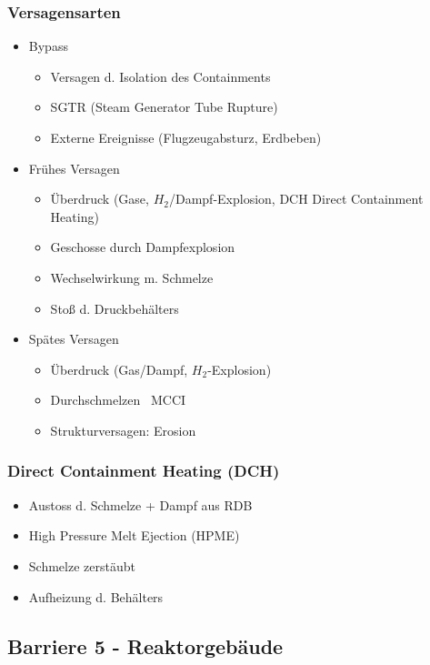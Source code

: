 \documentclass[12pt]{article}
\begin{document}
\subsubsection{Versagensarten}
\begin{itemize}[noitemsep]
	\item Bypass
		\begin{itemize}[noitemsep]
			\item Versagen d. Isolation des Containments
			\item SGTR (Steam Generator Tube Rupture)
			\item Externe Ereignisse (Flugzeugabsturz, Erdbeben)
		\end{itemize}
	\item Frühes Versagen
		\begin{itemize}[noitemsep]
			\item Überdruck (Gase, \(H_2\)/Dampf-Explosion, DCH \textrightarrow Direct Containment Heating)
			\item Geschosse durch Dampfexplosion
			\item Wechselwirkung m. Schmelze
			\item Stoß d. Druckbehälters
		\end{itemize}
	\item Spätes Versagen
		\begin{itemize}[noitemsep]
			\item Überdruck (Gas/Dampf, \(H_2\)-Explosion)
			\item Durchschmelzen \textrightarrow\ MCCI
			\item Strukturversagen: Erosion
		\end{itemize}
\end{itemize}

\subsubsection{Direct Containment Heating (DCH)}
\begin{itemize}[noitemsep]
	\item Austoss d. Schmelze + Dampf aus RDB
	\item High Pressure Melt Ejection (HPME)
	\item Schmelze zerstäubt
	\item Aufheizung d. Behälters
\end{itemize}

\subsection{Barriere 5 - Reaktorgebäude}
\end{document}
